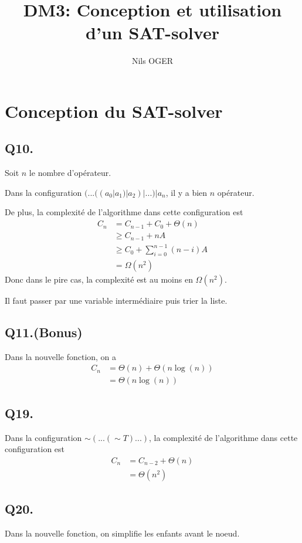 

\title{DM3: Conception et utilisation d’un SAT-solver}
\author{Nils OGER}
\date{}


	\maketitle
	\section{Conception du SAT-solver}
	\subsection*{Q10.}
	Soit $n$ le nombre d'opérateur.
	
	Dans la configuration $(...((a_0 | a_1) | a_2) | ...) | a_n$,
	il y a bien $n$ opérateur.
	
	De plus, la complexité de l'algorithme dans cette configuration est
	\begin{align*}
		C_n &= C_{n-1} + C_0 + \Theta(n)\\
		&\geq C_{n-1} + nA\\
		&\geq C_0 + \sum_{i=0}^{n-1}(n-i)A\\
		&= \Omega(n^2)
	\end{align*}
	Donc dans le pire cas, la complexité est au moins en $\Omega(n^2)$.
	
	Il faut passer par une variable intermédiaire puis trier la liste.
	
	\subsection*{Q11.(Bonus)}
	Dans la nouvelle fonction, on a
	\begin{align*}
		C_n &= \Theta(n) + \Theta(n\log(n))\\
		&= \Theta(n\log(n))
	\end{align*}
	
	\subsection*{Q19.}
	Dans la configuration $\sim(...(\sim T)...)$, 
	la complexité de l'algorithme dans cette configuration est
	\begin{align*}
		C_n &= C_{n-2} + \Theta(n)\\
		&= \Theta(n^2)
	\end{align*}
	
	\subsection*{Q20.}
	Dans la nouvelle fonction, on simplifie les enfants avant le noeud.
	
